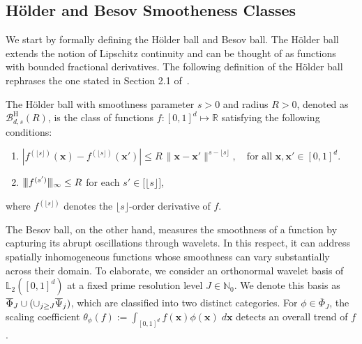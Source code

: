 \documentclass[twoside,11pt]{article}
\newcommand{\numbersetNonnegInt}{\mathbb{N}_0}
\newcommand{\Ell}{\mathbb{L}}
\newcommand{\EllTwo}{\Ell_2} %
\newcommand{\vectorize}[1]{\mathbf{#1}}
\newcommand{\dimDensity}{d} %
\newcommand{\smoothness}{s}
\newcommand{\ballRadius}{R}
\newcommand{\wavFatherFunc}{\phi}
\newcommand{\WavMotherBasisSet}{\overline{\uppercase{\Psi}}}
\newcommand{\resLev}{j}
\newcommand{\primResLev}{J}
\newcommand{\wavCoef}{\theta}
\newcommand{\multivInhomoWavFatherBasis}{\overline{\Phi}_{\primResLev}}
\newcommand{\wavGenericFatherCoef}{\wavCoef_{\wavFatherFunc}}
\newcommand{\domainTs}{
	[0,1]^{{\dimDensity}}
}
\newcommand{\ballDistn}{\mathcal{B}}
\newcommand{\holderBall}{\ballDistn_{\dimDensity, \smoothness}^{\mathrm{H}}(\ballRadius)} %
\begin{document}
\subsection{H\"{o}lder and Besov Smootheness Classes}\label{subsection:smoothness_class}
We start by formally defining the H\"{o}lder ball and Besov ball.
The H\"{o}lder ball extends the notion of Lipschitz continuity and can be thought of as functions with bounded fractional derivatives.
The following definition of the H\"{o}lder ball rephrases the one stated in Section 2.1 of~\citet{Arias-Castro2018RememberDimension}.
\begin{definition} \label{def:holder_ball}
	The H\"{o}lder ball with smoothness parameter \( \smoothness > 0 \) and radius \( R > 0 \), denoted as $\holderBall$, is the class of functions \( f : [0,1]^d \mapsto \mathbb{R} \) satisfying the following conditions:
	\begin{enumerate}
		\item  
		$
		\left| f^{(\lfloor \smoothness \rfloor)}(\vectorize{x}) - f^{(\lfloor \smoothness \rfloor)}(\vectorize{x}') \right| \leq R \, \| \vectorize{x} - \vectorize{x}' \|^{\smoothness - \lfloor \smoothness \rfloor}, \quad \text{for all } \vectorize{x}, \vectorize{x}' \in [0,1]^\dimDensity.
		$
		\item  
		$\vert\kern-0.25ex\vert\kern-0.25ex\vert f^{(s')} 
		\vert\kern-0.25ex \vert\kern-0.25ex \vert_\infty \leq R
		$ for each $s' \in \bigl[ \lfloor \smoothness \rfloor \bigr]$,
	\end{enumerate}
	where $f^{(\lfloor \smoothness \rfloor)}$ denotes the $\lfloor \smoothness \rfloor$-order derivative of $f$.
\end{definition}
The Besov ball, on the other hand, measures the smoothness of a function by capturing its abrupt oscillations through wavelets.
In this respect, it can address spatially inhomogeneous functions whose smoothness can vary substantially across their domain.
To elaborate, we consider an orthonormal wavelet basis of $\EllTwo(\domainTs)$ at a fixed prime resolution level $\primResLev \in \numbersetNonnegInt$.
We denote this basis as $\multivInhomoWavFatherBasis
\cup (\cup_{\resLev \geq \primResLev}
\WavMotherBasisSet_{\resLev})$, which are classified into two distinct categories.
For $\wavFatherFunc \in \multivInhomoWavFatherBasis$, the scaling coefficient 
$\wavGenericFatherCoef(f)
:=
\int_{[0,1]^d}
f(\vectorize{x})
\wavFatherFunc(\vectorize{x})
\;
d\vectorize{x}$
detects an overall trend of $f$.
\end{document}

